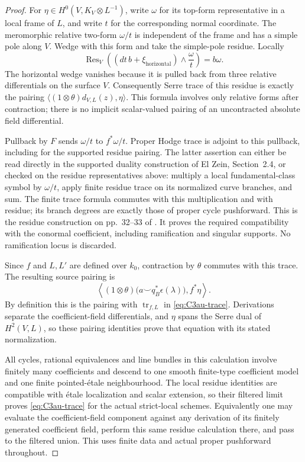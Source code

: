 \begin{proof}
For $\eta\in H^0(V,K_V\otimes L^{-1})$, write $\omega$ for
its top-form representative in a local frame of $L$, and
write $t$ for the corresponding normal coordinate. The
meromorphic relative two-form $\omega/t$ is independent of
the frame and has a simple pole along $V$. Wedge with this
form and take the simple-pole residue. Locally
\[
 \operatorname{Res}_V
       \left((dt\,b+\xi_{\mathrm{horizontal}})
                           \wedge\frac{\omega}{t}\right)
                 =b\omega.
\]
The horizontal wedge vanishes because it is pulled back from
three relative differentials on the surface $V$.
Consequently Serre trace of this residue is exactly the
pairing $\langle (1\otimes\theta)d_{V,L}(z),\eta\rangle$.
This formula involves only relative forms after contraction;
there is no implicit scalar-valued pairing of an uncontracted
absolute field differential.

Pullback by $F$ sends $\omega/t$ to $f^*\omega/t$. Proper
Hodge trace is adjoint to this pullback, including for the
supported residue pairing. The latter assertion can either
be read directly in the supported duality construction of
El Zein, Section~2.4, or checked on the residue representatives
above: multiply a local fundamental-class symbol by
$\omega/t$, apply finite residue trace on its normalized curve
branches, and sum. The finite trace formula commutes with
this multiplication and with residue; its branch degrees are
exactly those of proper cycle pushforward. This is the
residue construction on pp.~32--33 of
\citet{cyElZein1978}. It proves the required compatibility with
the conormal coefficient, including ramification and singular
supports. No ramification locus is discarded.

Since $f$ and $L,L'$ are defined over $k_0$, contraction by
$\theta$ commutes with this trace. The resulting source
pairing is
\[
 \left\langle
  (1\otimes\theta)\bigl(a\smile q_B^*\epsilon(\lambda)\bigr),
                  f^*\eta\right\rangle.
\]
By definition this is the pairing with
$\operatorname{tr}_{f,L}$ in \eqref{eq:C3au-trace}.
Derivations separate the coefficient-field differentials,
and $\eta$ spans the Serre dual of $H^2(V,L)$, so these
pairing identities prove that equation with its stated
normalization.

All cycles, rational equivalences and line bundles in this
calculation involve finitely many coefficients and descend to
one smooth finite-type coefficient model and one finite
pointed-\'etale neighbourhood. The local residue identities
are compatible with \'etale localization and scalar extension,
so their filtered limit proves \eqref{eq:C3au-trace} for the
actual strict-local schemes. Equivalently one may evaluate the
coefficient-field component against any derivation of its
finitely generated coefficient field, perform this same
residue calculation there, and pass to the filtered union.
This uses finite data and actual proper pushforward throughout.


\end{proof}
